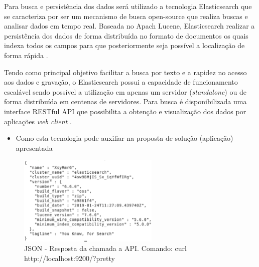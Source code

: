 Para busca e persistência dos dados será utilizado a tecnologia Elasticsearch que se caracteriza por ser um mecanismo de busca open-source que realiza buscas e analisar dados em tempo real.
Baseada no Apach Lucene, Elasticsearch realizar a persistência dos dados de forma distribuída no formato de documentos os quais indexa todos os campos para que posteriormente seja possível a localização de forma rápida \cite{Gormley:2015}.

Tendo como principal objetivo facilitar a busca por texto e a rapidez no acesso aos dados e gravação, 
o Elasticsearch possui a capacidade de funcionamento escalável sendo possível a utilização em apenas um servidor (\textit{standalone}) ou de forma distribuída em centenas de servidores.
Para busca é disponibilizada uma interface RESTful API que possibilita a obtenção e visualização dos dados por aplicações \textit{web client} \cite{Gormley:2015}.

\begin{itemize}
	\item Como esta tecnologia pode auxiliar na proposta de solução (aplicação) apresentada
\end{itemize}
\begin{figure}[!htb]
	\caption{\label{fig_grafico}JSON - Resposta da chamada a API. Comando: curl http://localhost:9200/?pretty}
	\begin{center}
		\includegraphics[width=0.6\textwidth]{imagens/pretty.eps}
	\end{center}
\end{figure}
